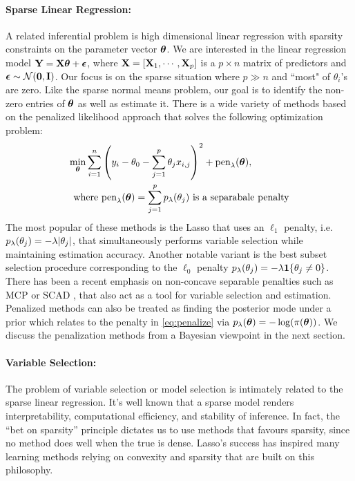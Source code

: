\documentclass[11pt]{article}
\numberwithin{equation}{section}
\begin{document}
\paragraph{Sparse Linear Regression:} A related inferential problem is high dimensional linear regression with sparsity constraints on the parameter vector $\boldsymbol{\theta}$. We are interested in the linear regression model ${\bf Y} = {\bf X} \boldsymbol{\theta} + \boldsymbol{\epsilon}$, where ${\bf X} = [{\bf X}_1, \cdots, {\bf X}_p]$ is a $p \times n$ matrix of predictors and $\boldsymbol{\epsilon} \sim {\cal N}({\bf 0}, {\bf I})$. Our focus is on the sparse situation where $p \gg n$ and ``most" of $\theta_i$'s are zero. Like the sparse normal means problem, our goal is to identify the non-zero entries of $\boldsymbol{\theta}$ as well as estimate it. There is a wide variety of methods based on the penalized likelihood approach that solves the following optimization problem:
\begin{align}
\min_{\boldsymbol{\theta}} \sum_{i=1}^{n} &  \left( y_i - \theta_0 - \sum_{j=1}^{p} \theta_j x_{i,j} \right)^2 + \text{pen}_{\lambda}(\boldsymbol{\theta}), \label{eq:penalize} \\
\text{where } & \text{pen}_{\lambda}(\boldsymbol{\theta}) = \sum_{j=1}^{p} p_{\lambda}(\theta_j) \text{ is a separabale penalty} \nonumber
\end{align}
 The most popular of these methods is the Lasso that uses an $\ell_1$ penalty, i.e. $p_{\lambda}(\theta_j) = -\lambda \lvert\theta_j\rvert$, that simultaneously performs variable selection while maintaining estimation accuracy. Another notable variant is the best subset selection procedure corresponding to the $\ell_0$ penalty $p_{\lambda}(\theta_j) = -\lambda {\bf 1}\{\theta_j \ne 0\}$. There has been a recent emphasis on non-concave separable penalties such as MCP \citep{zhang2010nearly} or SCAD \citep{fan2001variable}, that also act as a tool for variable selection and estimation. Penalized methods can also be treated as finding the posterior mode under a prior which relates to the penalty in \eqref{eq:penalize} via $p_{\lambda}(\boldsymbol{\theta}) = -\log(\pi(\boldsymbol{\theta}))$. We discuss the penalization methods from a Bayesian viewpoint in the next section. 

\paragraph{Variable Selection:} The problem of variable selection or model selection is intimately related to the sparse linear regression. It's well known that a sparse model renders interpretability, computational efficiency, and stability of inference. In fact, the ``bet on sparsity'' principle \citep{hastie09} dictates us to use methods that favours sparsity, since no method does well when the true is dense. Lasso's success has inspired many learning methods relying on convexity and sparsity that are built on this philosophy. 
\end{document}
